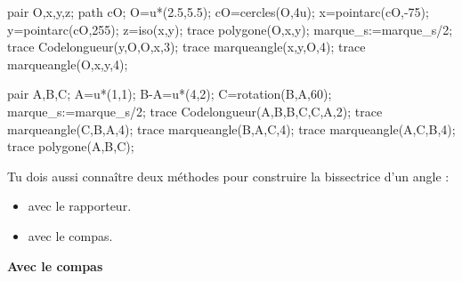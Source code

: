 \begin{changemargin}{0mm}{-15mm}
    \hspace*{10mm}
    \begin{Geometrie}[CoinHD={(6u,6u)}]
        pair O,x,y,z;
        path cO;
        O=u*(2.5,5.5);
        cO=cercles(O,4u);
        x=pointarc(cO,-75);
        y=pointarc(cO,255);
        z=iso(x,y);
        trace polygone(O,x,y);
        marque_s:=marque_s/2;
        trace Codelongueur(y,O,O,x,3);
        trace marqueangle(x,y,O,4);
        trace marqueangle(O,x,y,4);
    \end{Geometrie}
    \hspace*{10mm}
    \begin{Geometrie}[CoinHD={(6u,6u)}]
        pair A,B,C;
        A=u*(1,1);
        B-A=u*(4,2);
        C=rotation(B,A,60);
        marque_s:=marque_s/2;
        trace Codelongueur(A,B,B,C,C,A,2);
        trace marqueangle(C,B,A,4);
        trace marqueangle(B,A,C,4);
        trace marqueangle(A,C,B,4);
        trace polygone(A,B,C);
    \end{Geometrie}

    \begin{remarque}
        Tu dois aussi connaître deux méthodes pour construire la bissectrice d'un angle :
        \begin{itemize}
            \item avec le rapporteur.
            \item avec le compas.
        \end{itemize}
        \begin{center}
            \textbf{Avec le compas}


\end{center}
\end{remarque}
\end{changemargin}
